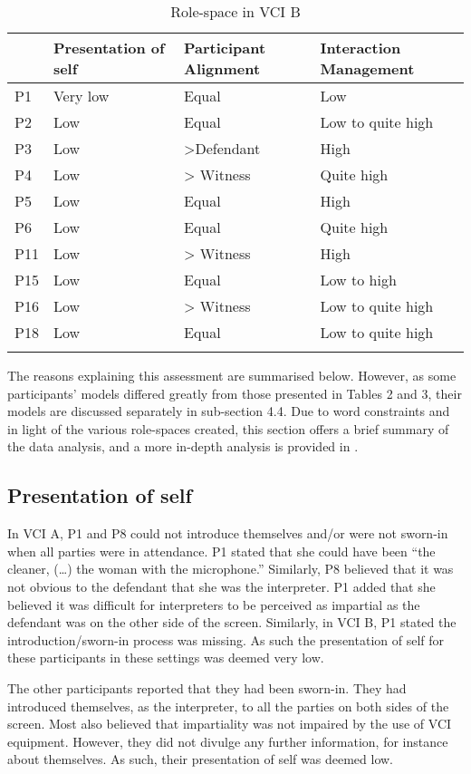 \documentclass[output=paper]{langsci/langscibook}
\begin{document}
\begin{table}
\begin{tabular}{llll}
\lsptoprule
& {Presentation of self} & {Participant Alignment} & {Interaction Management}\\\midrule
P1 & Very low & Equal & Low\\
P2 & Low & Equal & Low to quite high\\
P3 & Low & >Defendant & High\\
P4 & Low & > Witness & Quite high\\
P5 & Low & Equal & High\\
P6 & Low & Equal & Quite high \\
P11 & Low & > Witness & High\\
P15 & Low & Equal & Low to high \\
P16 & Low & > Witness & Low to quite high\\
P18 & Low & Equal & Low to quite high\\
\lspbottomrule
\end{tabular}
\caption{Role-space in \textsc{VCI} B\label{tab:devaux:3}}
\end{table}

The reasons explaining this assessment are summarised below. However, as some participants’ models differed greatly from those presented in Tables 2 and 3, their models are discussed separately in sub-section 4.4. Due to word constraints and in light of the various role-spaces created, this section offers a brief summary of the data analysis, and a more in-depth analysis is provided in \citet{Devaux2017b}.

\subsection{Presentation of self}
In \textsc{VCI} A, P1 and P8 could not introduce themselves and/or were not sworn-in when all parties were in attendance. P1 stated that she could have been “the cleaner, (…) the woman with the microphone.” Similarly, P8 believed that it was not obvious to the defendant that she was the interpreter. P1 added that she believed it was difficult for interpreters to be perceived as impartial as the defendant was on the other side of the screen. Similarly, in \textsc{VCI} B, P1 stated the introduction/sworn-in process was missing. As such the presentation of self for these participants in these settings was deemed very low. 

The other participants reported that they had been sworn-in. They had introduced themselves, as the interpreter, to all the parties on both sides of the screen. Most also believed that impartiality was not impaired by the use of \textsc{VCI} equipment. However, they did not divulge any further information, for instance about themselves. As such, their presentation of self was deemed low.
\end{document}
